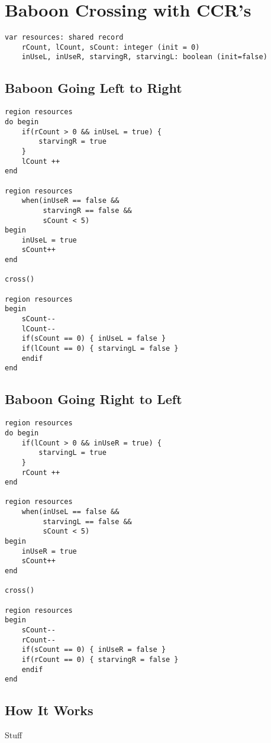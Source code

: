 \documentclass[]{article}
\begin{document}
\section{Baboon Crossing with CCR's}
\begin{verbatim}
var resources: shared record 
    rCount, lCount, sCount: integer (init = 0)
    inUseL, inUseR, starvingR, starvingL: boolean (init=false)
\end{verbatim}
    
\begin{multicols}{2}
\subsection{Baboon Going Left to Right}
\begin{verbatim}
region resources
do begin
    if(rCount > 0 && inUseL = true) {
        starvingR = true
    }
    lCount ++
end

region resources 
    when(inUseR == false &&
         starvingR == false && 
         sCount < 5) 
begin
    inUseL = true
    sCount++
end

cross()

region resources
begin
    sCount--
    lCount--
    if(sCount == 0) { inUseL = false }
    if(lCount == 0) { starvingL = false }
    endif
end
\end{verbatim}

\subsection{Baboon Going Right to Left}
\begin{verbatim}
region resources
do begin
    if(lCount > 0 && inUseR = true) {
        starvingL = true
    }
    rCount ++
end

region resources 
    when(inUseL == false &&
         starvingL == false && 
         sCount < 5) 
begin
    inUseR = true
    sCount++
end

cross()

region resources
begin
    sCount--
    rCount--
    if(sCount == 0) { inUseR = false }
    if(rCount == 0) { starvingR = false }
    endif
end
\end{verbatim}
\end{multicols}

\subsection{How It Works}
Stuff
\end{document}
